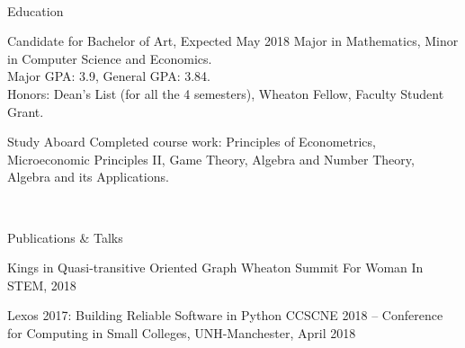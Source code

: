 \documentclass[]{resume-knyte}
\begin{document}



\begin{subheader}{1}
    \\

\end{subheader}

\begin{topic}{Education}


    {Candidate for Bachelor of Art, Expected May 2018}
    {Major in Mathematics, Minor in Computer Science and Economics.\\
     Major GPA: 3.9, General GPA: 3.84.\\
    Honors: Dean's List (for all the 4 semesters), Wheaton Fellow, Faculty Student Grant.}


    {Study Aboard}
    {Completed course work: Principles of Econometrics, Microeconomic Principles II, Game Theory,
     Algebra and Number Theory, Algebra and its Applications.
    }

    \\ %
\end{topic}


\begin{topic}{Publications \& Talks}

    {}
    {Kings in Quasi-transitive Oriented Graph}
    {Wheaton Summit For Woman In STEM, 2018}


    {}
    {Lexos 2017: Building Reliable Software in Python}
    {CCSCNE 2018 – Conference for Computing in Small Colleges, UNH-Manchester, April 2018}

    \\
\end{topic}
\end{document}
